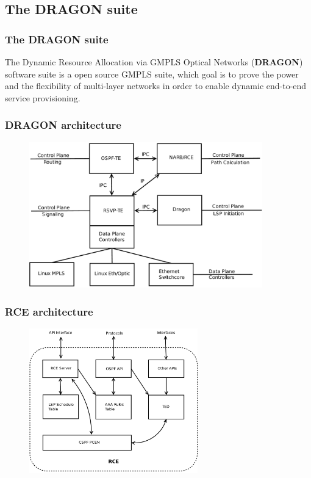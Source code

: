 \documentclass{beamer}
\begin{document}
\subsection{The DRAGON suite}
\frame 
{ 
  \frametitle{The DRAGON suite}

  The Dynamic Resource Allocation via GMPLS Optical Networks
  (\textbf{DRAGON}) software suite is a open source GMPLS suite, which
  goal is to prove the power and the flexibility of multi-layer
  networks in order to enable dynamic end-to-end service provisioning.

}
\frame
{
  \frametitle{DRAGON architecture}

  \begin{figure}[!htbp]
    \begin{center}
      \includegraphics[width=0.9\textwidth]{img/dragon_model}
      \label{fig:dragon_model}
    \end{center}
  \end{figure}
}
\frame
{
  \frametitle{RCE architecture}

  \begin{figure}[!htbp]
    \begin{center}
      \includegraphics[width=0.65\textwidth]{img/rce_model}
    \end{center}
  \end{figure}
}
\end{document}
